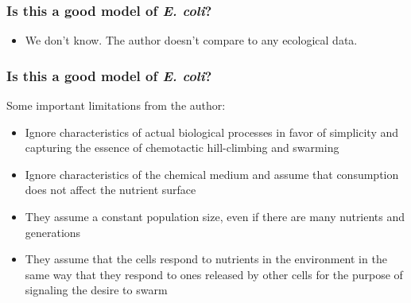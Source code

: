 \documentclass{beamer}
\begin{document}
\begin{frame}
\frametitle{Is this a good model of \textit{E. coli}?}
\begin{itemize}
  \item<2-> We don't know. The author doesn't compare to any ecological data.
\end{itemize}
\end{frame}

\begin{frame}
\frametitle{Is this a good model of \textit{E. coli}?}
Some important limitations from the author:
\begin{itemize}
  \item<1> Ignore characteristics of actual biological processes in favor of simplicity and capturing the essence of chemotactic hill-climbing and swarming
  \item<2> Ignore characteristics of the chemical medium and  assume that consumption does not affect the nutrient surface
  \item<3> They assume a constant population size, even if there are many nutrients and generations
  \item<4> They assume that the cells respond to nutrients in the environment in the same way that they respond to ones released by other cells for the purpose of signaling the desire to swarm
\end{itemize}
\end{frame}
\end{document}
